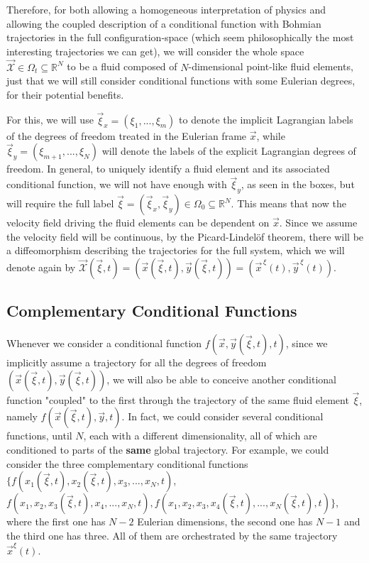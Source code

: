 \documentclass[11pt, a4paper]{article} %
\newcommand{\R}{\mathbb{R}} %
\newcommand{\x}{\mathcal{X}}
\begin{document}
Therefore, for both allowing a homogeneous interpretation of physics and allowing the coupled description of a conditional function with Bohmian trajectories in the full configuration-space (which seem philosophically the most interesting trajectories we can get), we will consider the whole space $\vec{\x}\in\Omega_t\subseteq\R^N$ to be a fluid composed of $N$-dimensional point-like fluid elements, just that we will still consider conditional functions with some Eulerian degrees, for their potential benefits.

For this, we will use $\vec{\xi}_x=(\xi_1,...,\xi_m)$ to denote the implicit Lagrangian labels of the degrees of freedom treated in the Eulerian frame $\vec{x}$, while $\vec{\xi}_y=(\xi_{m+1},...,\xi_N)$ will denote the labels of the explicit Lagrangian degrees of freedom. In general, to uniquely identify a fluid element and its associated conditional function, we will not have enough with $\vec{\xi}_y$, as seen in the boxes, but will require the full label $\vec{\xi}=(\vec{\xi}_x,\vec{\xi}_y)\in \Omega_0\subseteq\R^N$. This means that now the velocity field driving the fluid elements can be dependent on $\vec{x}$. Since we assume the velocity field will be continuous, by the Picard-Lindelöf theorem, there will be a diffeomorphism describing the trajectories for the full system, which we will denote again by $\vec{\x}(\vec{\xi},t)=(\vec{x}(\vec{\xi},t), \vec{y}(\vec{\xi},t))=(\vec{x}^{\, \xi}(t),\vec{y}^{\, \xi}(t))$. 

\subsection*{Complementary Conditional Functions}

Whenever we consider a conditional function $f(\vec{x},\vec{y}(\vec{\xi},t),t)$, since we implicitly assume a trajectory for all the degrees of freedom $(\vec{x}(\vec{\xi},t), \vec{y}(\vec{\xi},t))$, we will also be able to conceive another conditional function "coupled" to the first through the trajectory of the same fluid element $\vec{\xi}$, namely $f(\vec{x}(\vec{\xi},t),\vec{y},t)$. In fact, we could consider several conditional functions, until $N$, each with a different dimensionality, all of which are conditioned to parts of the {\bf same} global trajectory. For example, we could consider the three complementary conditional functions $\{f(x_1(\vec{\xi},t),x_2(\vec{\xi},t),x_3,...,x_N,t)$, $f(x_1, x_2, x_3(\vec{\xi},t), x_4,...,x_N,t), f(x_1, x_2, x_3, x_4(\vec{\xi},t),...,x_N(\vec{\xi},t),t)\}$, where the first one has $N-2$ Eulerian dimensions, the second one has $N-1$ and the third one has three. All of them are orchestrated by the same trajectory $\vec{x}^\xi(t)$.
\end{document}
